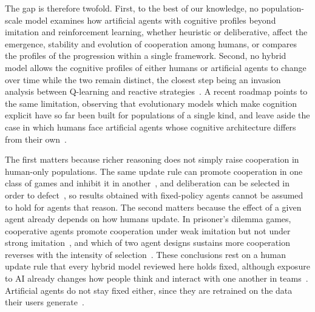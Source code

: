 The gap is therefore twofold. First, to the best of our knowledge, no population-scale model examines how artificial agents with cognitive profiles beyond imitation and reinforcement learning, whether heuristic or deliberative, affect the emergence, stability and evolution of cooperation among humans, or compares the profiles of the progression within a single framework. Second, no hybrid model allows the cognitive profiles of either humans or artificial agents to change over time while the two remain distinct, the closest step being an invasion analysis between Q-learning and reactive strategies~\cite{quanHumanMachineCooperation2026}. A recent roadmap points to the same limitation, observing that evolutionary models which make cognition explicit have so far been built for populations of a single kind, and leave aside the case in which humans face artificial agents whose cognitive architecture differs from their own~\cite{hanSocialPhysicsAge2026}.

The first matters because richer reasoning does not simply raise cooperation in human-only populations. The same update rule can promote cooperation in one class of games and inhibit it in another~\cite{wangEvolutionaryGameDynamics2019}, and deliberation can be selected in order to defect~\cite{Bear2016}, so results obtained with fixed-policy agents cannot be assumed to hold for agents that reason. The second matters because the effect of a given agent already depends on how humans update. In prisoner's dilemma games, cooperative agents promote cooperation under weak imitation but not under strong imitation~\cite{sharmaSmallBotsBig2023, guoFacilitatingCooperationHumanagent2023}, and which of two agent designs sustains more cooperation reverses with the intensity of selection~\cite{zimmaroEmergenceCooperationOneshot2024}. These conclusions rest on a human update rule that every hybrid model reviewed here holds fixed, although exposure to AI already changes how people think and interact with one another in teams~\cite{riedlCognitiveSpilloverHuman2026}. Artificial agents do not stay fixed either, since they are retrained on the data their users generate~\cite{hanSocialPhysicsAge2026, pedreschiHumanAICoevolution2025}.
